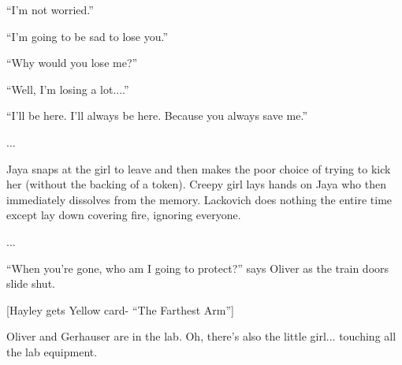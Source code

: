 ``I'm not worried.''

``I'm going to be sad to lose you.''

``Why would you lose me?''

``Well, I'm losing a lot....''

``I'll be here.  I'll always be here.  Because you always save me.''

...

Jaya snaps at the girl to leave and then makes the poor choice of trying to kick her (without the backing of a token).  Creepy girl lays hands on Jaya who then immediately dissolves from the memory.   Lackovich does nothing the entire time except lay down covering fire, ignoring everyone. 

...

``When you're gone, who am I going to protect?'' says Oliver as the train doors slide shut.



{[}Hayley gets Yellow card- ``The Farthest Arm''{]}






Oliver and Gerhauser are in the lab.  Oh, there's also the little girl... touching all the lab equipment. 

